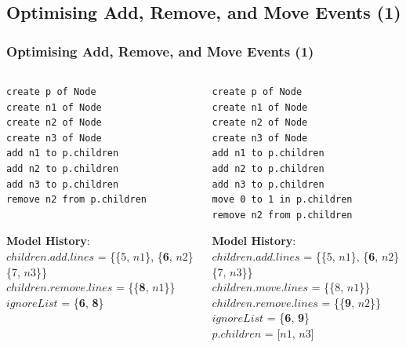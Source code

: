 \documentclass{beamer}
\begin{document}
\begin{frame}[fragile]
\section{Optimising Add, Remove, and Move Events (1)}
\frametitle{Optimising Add, Remove, and Move Events (1)}

\begin{columns}
\begin{column}[t]{0.5\linewidth}
\begin{lstlisting}[style=eol,caption={A CBP of add and remove operations.},label=lst:add_move_reference]
create p of Node
create n1 of Node
create n2 of Node
create n3 of Node
add n1 to p.children
add n2 to p.children
add n3 to p.children
remove n2 from p.children
   
\end{lstlisting}

\begin{footnotesize}
\textbf{Model History}:\\
$children$.$add$.$lines$ = \{\{5, $n1$\}, \{\textbf{6}, $n2$\} \{7, $n3$\}\}\\
$children$.$remove$.$lines$ = \{\{\textbf{8}, $n1$\}\}\\
$ignoreList$ = \{\textbf{6}, \textbf{8}\}
\end{footnotesize}

\end{column}
\begin{column}[t]{0.5\linewidth}
\begin{lstlisting}[style=eol,caption={A CBP representation of add, move, and remove operations.},label=lst:add_remove_move_reference]
create p of Node         
create n1 of Node        
create n2 of Node        
create n3 of Node        
add n1 to p.children     
add n2 to p.children     
add n3 to p.children     
move 0 to 1 in p.children
remove n2 from p.children
\end{lstlisting}

\begin{footnotesize}
\textbf{Model History}:\\
$children$.$add$.$lines$ = \{\{5, $n1$\}, \{\textbf{6}, $n2$\} \{7, $n3$\}\}\\
$children$.$move$.$lines$ = \{\{8, $n1$\}\}\\
$children$.$remove$.$lines$ = \{\{\textbf{9}, $n2$\}\}\\
$ignoreList$ = \{\textbf{6}, \textbf{9}\}\\
$p$.$children$ = [$n1$, $n3$]
\end{footnotesize}

\end{column}
\end{columns}

\end{frame}
\end{document}
